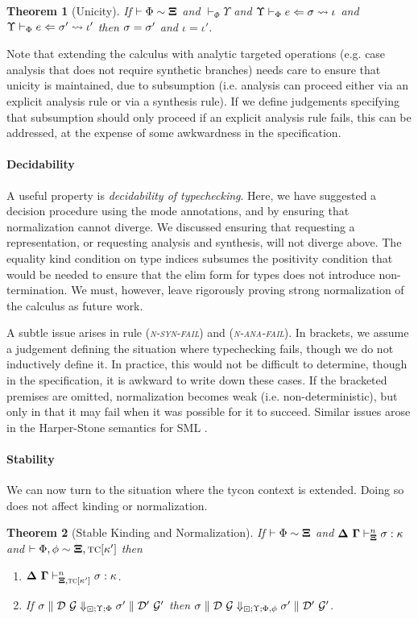 \documentclass[9pt,preprint]{sigplanconf}
\newcommand{\rulename}[1]{({\textsc{\textsl{#1}}})}
\newtheorem{theorem}{Theorem}
\begin{document}
\begin{theorem}[Unicity]
If $\vdash \Phi \sim \boldsymbol\Xi$ and $\vdash_\Phi \Upsilon$  and $\Upsilon \vdash_{\Phi} e \Leftarrow \sigma \leadsto \iota$ and $\Upsilon \vdash_{\Phi} e \Leftarrow \sigma' \leadsto \iota'$ then  $\sigma=\sigma'$ and $\iota=\iota'$.
\end{theorem}

Note that extending the calculus with analytic targeted operations (e.g. case analysis that does not require synthetic branches) needs care to ensure that unicity is maintained, due to subsumption (i.e. analysis can proceed either via an explicit analysis rule or via a synthesis rule). If we define judgements specifying that subsumption should only proceed if an explicit analysis rule fails, this can be addressed, at the expense of some awkwardness in the specification.

\paragraph{Decidability} A useful property is \emph{decidability of typechecking}. Here, we have suggested a decision procedure using the mode annotations, and by ensuring that normalization cannot diverge. We discussed ensuring that requesting a representation, or requesting analysis and synthesis, will not diverge above. The equality kind condition on type indices subsumes the positivity condition that would be needed to ensure that the elim form for types does not introduce non-termination. We must, however, leave rigorously proving strong normalization of the calculus as future work.

A subtle issue arises in rule \rulename{n-syn-fail} and \rulename{n-ana-fail}. In brackets, we assume a judgement defining the situation where typechecking fails, though we do not inductively define it. In practice, this would not be difficult to determine, though in the specification, it is awkward to write down these cases. If the bracketed premises are omitted, normalization becomes weak (i.e. non-deterministic), but only in that it may fail when it was possible for it to succeed. Similar issues arose in the Harper-Stone semantics for SML \cite{Harper00atype-theoretic}.

\paragraph{Stability}
We can now turn to the situation where the tycon context is extended. Doing so does not affect kinding or normalization.
\begin{theorem}[Stable Kinding and Normalization]
If $\vdash \Phi \sim \boldsymbol\Xi$ and $\boldsymbol\Delta~\boldsymbol\Gamma \vdash_{\boldsymbol\Xi}^{n} \sigma : \kappa$ and $\vdash \Phi, \phi \sim \boldsymbol\Xi, \textsc{tc}[\kappa']$ then \begin{enumerate}
\item $\boldsymbol\Delta~\boldsymbol\Gamma \vdash_{\boldsymbol\Xi, \textsc{tc}[\kappa']}^{n} \sigma : \kappa$.
\item If $\sigma \parallel \mathcal{D}~\mathcal{G} \Downarrow_{\boxdot; \Upsilon; \Phi} \sigma' \parallel \mathcal{D}'~\mathcal{G}'$ then $\sigma \parallel \mathcal{D}~\mathcal{G} \Downarrow_{\boxdot; \Upsilon; \Phi, \phi} \sigma' \parallel \mathcal{D}'~\mathcal{G}'$.
\end{enumerate}
\end{theorem}
\end{document}
